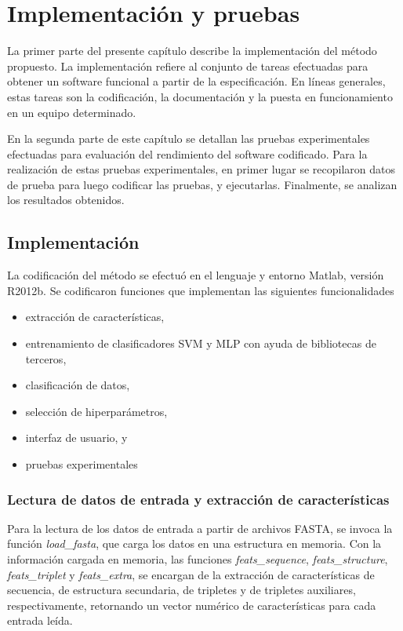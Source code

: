 \documentclass[12pt,bibliography=oldstyle,DIV=12,parskip=half-]{scrreprt}
\begin{document}
\chapter{Implementación y pruebas}
%
La primer parte del presente capítulo describe la implementación del
método propuesto.  La implementación refiere al conjunto de tareas
efectuadas para obtener un software funcional a partir de la
especificación. En líneas generales, estas tareas son la codificación,
la documentación y la puesta en funcionamiento en un equipo
determinado.

En la segunda parte de este capítulo se detallan las pruebas
experimentales efectuadas para evaluación del rendimiento del software
codificado. Para la realización de estas pruebas experimentales, en
primer lugar se recopilaron datos de prueba para luego codificar las
pruebas, y ejecutarlas. Finalmente, se analizan los resultados
obtenidos.
%
%
%
\section{Implementación}
%
La codificación del método se efectuó en el lenguaje y entorno Matlab,
versión R2012b. Se codificaron funciones que implementan las
siguientes funcionalidades
%
\begin{itemize}
\item extracción de características,
\item entrenamiento de clasificadores SVM y MLP con ayuda de
  bibliotecas de terceros,
\item clasificación de datos,
\item selección de hiperparámetros,
\item interfaz de usuario, y
\item pruebas experimentales
\end{itemize}
%

%
%
\subsection{Lectura de datos de entrada y extracción de características}
%
\newcommand{\func}[1]{\emph{#1}}
%
Para la lectura de los datos de entrada a partir de archivos FASTA, se
invoca la función \func{load\_fasta}, que carga los datos
en una estructura en memoria.
Con la información cargada en memoria, las funciones
\func{feats\_sequence}, \func{feats\_structure}, \func{feats\_triplet}
y \func{feats\_extra}, se encargan de la extracción de
características de secuencia, de estructura secundaria, de tripletes y
de tripletes auxiliares, respectivamente, retornando un vector
numérico de características para cada entrada leída.
\end{document}
